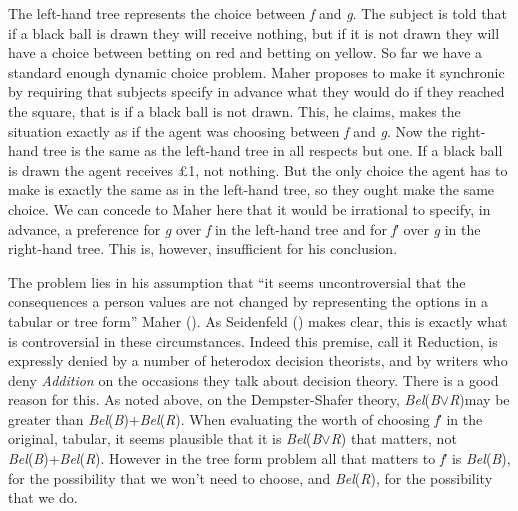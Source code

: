 \documentclass[
  11pt,
  letterpaper,
  DIV=11,
  numbers=noendperiod,
  twoside]{scrartcl}
\begin{document}
The left-hand tree represents the choice between \emph{f} and \emph{g}.
The subject is told that if a black ball is drawn they will receive
nothing, but if it is not drawn they will have a choice between betting
on red and betting on yellow. So far we have a standard enough dynamic
choice problem. Maher proposes to make it synchronic by requiring that
subjects specify in advance what they would do if they reached the
square, that is if a black ball is not drawn. This, he claims, makes the
situation exactly as if the agent was choosing between \emph{f} and
\emph{g}. Now the right-hand tree is the same as the left-hand tree in
all respects but one. If a black ball is drawn the agent receives £1,
not nothing. But the only choice the agent has to make is exactly the
same as in the left-hand tree, so they ought make the same choice. We
can concede to Maher here that it would be irrational to specify, in
advance, a preference for \emph{g} over \emph{f} in the left-hand tree
and for \emph{f}′ over \emph{g} in the right-hand tree. This is,
however, insufficient for his conclusion.

The problem lies in his assumption that ``it seems uncontroversial that
the consequences a person values are not changed by representing the
options in a tabular or tree form'' Maher
(). As Seidenfeld
() makes clear, this is exactly what
is controversial in these circumstances. Indeed this premise, call it
Reduction, is expressly denied by a number of heterodox decision
theorists, and by writers who deny \emph{Addition} on the occasions they
talk about decision theory. There is a good reason for this. As noted
above, on the Dempster-Shafer theory,
\emph{Bel}(\emph{B}\({\vee}\)\emph{R})may be greater than
\emph{Bel}(\emph{B})+\emph{Bel}(\emph{R}). When evaluating the worth of
choosing \emph{f}′ in the original, tabular, it seems plausible that it
is \emph{Bel}(\emph{B}\({\vee}\)\emph{R}) that matters, not
\emph{Bel}(\emph{B})+\emph{Bel}(\emph{R}). However in the tree form
problem all that matters to \emph{f}′ is \emph{Bel}(\emph{B}), for the
possibility that we won't need to choose, and \emph{Bel}(\emph{R}), for
the possibility that we do.
\end{document}
